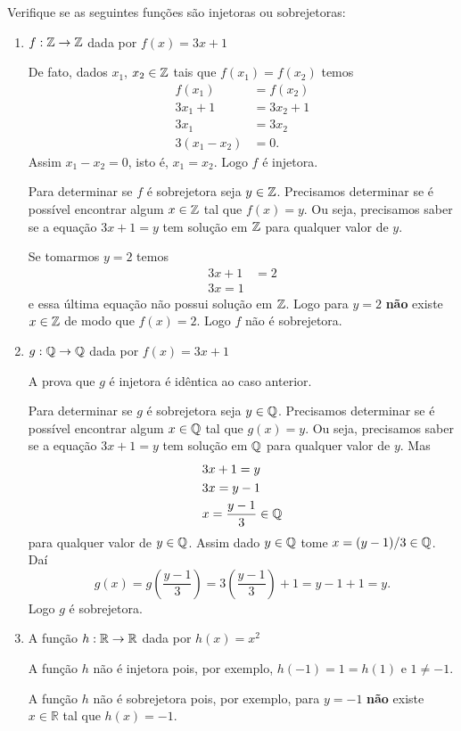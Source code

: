 \begin{exemplos}
	Verifique se as seguintes funções são injetoras ou sobrejetoras:
	\begin{enumerate}
		\item $f : \mathbb{Z} \to \mathbb{Z}$ dada por $f(x) = 3x + 1$
		\begin{solucao}
			De fato, dados $x_1$, $x_2 \in \mathbb{Z}$ tais que $f(x_1) = f(x_2)$ temos
			\begin{align*}
				f(x_1) &= f(x_2)\\
				3x_1 + 1 &= 3x_2 + 1\\
				3x_1 &= 3x_2\\
				3(x_1 - x_2) &= 0.
			\end{align*}
			Assim $x_1 - x_2 = 0$, isto é, $x_1 = x_2$. Logo $f$ é injetora.

			Para determinar se $f$ é sobrejetora seja $y \in \mathbb{Z}$. Precisamos determinar se é possível encontrar algum $x \in \mathbb{Z}$ tal que $f(x) = y$. Ou seja, precisamos saber se a equação $3x + 1 = y$ tem solução em $\mathbb{Z}$ para qualquer valor de $y$.

			Se tomarmos $y = 2$ temos
			\begin{align*}
				3x + 1 &= 2\\
				3x = 1
			\end{align*}
			e essa última equação não possui solução em $\mathbb{Z}$. Logo para $y = 2$ \textbf{não} existe $x \in \mathbb{Z}$ de modo que $f(x) = 2$. Logo $f$ não é sobrejetora.
		\end{solucao}

		\item $g : \mathbb{Q} \to \mathbb{Q}$ dada por $f(x) = 3x + 1$
		\begin{solucao}
			A prova que $g$ é injetora é idêntica ao caso anterior.

			Para determinar se $g$ é sobrejetora seja $y \in \mathbb{Q}$. Precisamos determinar se é possível encontrar algum $x \in \mathbb{Q}$ tal que $g(x) = y$. Ou seja, precisamos saber se a equação $3x + 1 = y$ tem solução em $\mathbb{Q}$ para qualquer valor de $y$. Mas
			\begin{align*}
				&3x + 1 = y\\
				&3x = y - 1\\
				&x = \dfrac{y - 1}{3} \in \mathbb{Q}
			\end{align*}
			para qualquer valor de $y \in \mathbb{Q}$. Assim dado $y \in \mathbb{Q}$ tome $x = (y - 1)/3 \in \mathbb{Q}$. Daí
			\[
				g(x) = g\left(\dfrac{y - 1}{3}\right) = 3\left(\dfrac{y - 1}{3}\right) + 1 = y - 1 + 1 = y. 
			\]
			Logo $g$ é sobrejetora.
		\end{solucao}
		
		\item A função $h :\mathbb{R} \to \mathbb{R}$ dada por $h(x) = x^2$
		\begin{solucao}
			A função $h$ não é injetora pois, por exemplo, $h(-1) = 1 = h(1)$ e $1\neq -1$.

			A função $h$ não é sobrejetora pois, por exemplo, para $y = -1$ \textbf{não} existe $x\in\mathbb{R}$ tal que $h(x) = -1$.
		\end{solucao}
		\end{enumerate}
\end{exemplos}

